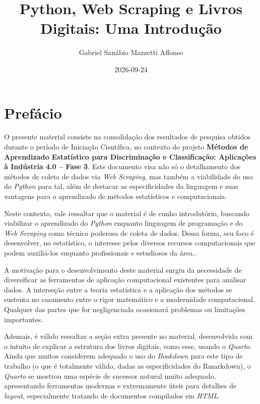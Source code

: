 \documentclass[
  brazilian,
  letterpaper,
  DIV=11,
  numbers=noendperiod]{scrreprt}
\title{Python, Web Scraping e Livros Digitais: Uma Introdução}
\author{Gabriel Sanábio Mazzetti Affonso}
\date{2026-09-24}
\renewcommand*\contentsname{Índice}
\newcommand\contentsname{Índice}
\begin{document}
\maketitle

\renewcommand*\contentsname{Índice}
{
\hypersetup{linkcolor=}
\setcounter{tocdepth}{2}
\tableofcontents
}


\chapter*{Prefácio}\label{prefuxe1cio}


O presente material consiste na consolidação dos resultados de pesquisa
obtidos durante o período de Iniciação Científica, no contexto do
projeto \textbf{Métodos de Aprendizado Estatístico para Discriminação e
Classificação: Aplicações à Indústria 4.0 -- Fase 3}. Este documento
visa não só o detalhamento dos métodos de coleta de dados via \emph{Web
Scraping}, mas também a viabilidade do uso do \emph{Python} para tal,
além de destacar as especificidades da linguagem e suas vantagens para o
aprendizado de métodos estatísticos e computacionais.

Neste contexto, vale ressaltar que o material é de cunho introdutório,
buscando viabilizar o aprendizado do \emph{Python} enquanto linguagem de
programação e do \emph{Web Scraping} como técnica poderosa de coleta de
dados. Dessa forma, seu foco é desenvolver, no estatístico, o interesse
pelos diversos recursos computacionais que podem auxiliá-los enquanto
profissionais e estudiosos da área..

A motivação para o desenvolvimento deste material surgiu da necessidade
de diversificar as ferramentas de aplicação computacional existentes
para analisar dados. A interseção entre a teoria estatística e a
aplicação dos métodos se sustenta no casamento entre o rigor matemático
e a modernidade computacional. Qualquer das partes que for negligenciada
ocasionará problemas ou limitações importantes.

Ademais, é válido ressaltar a seção extra presente no material,
desenvolvida com o intuito de explicar a estrutura dos livros digitais,
como esse, usando o \emph{Quarto}. Ainda que muitos considerem adequado
o uso do \emph{Bookdown} para este tipo de trabalho (o que é totalmente
válido, dadas as especificidades do Rmarkdown), o \emph{Quarto} se
mostrou uma espécie de sucessor natural muito adequado, apresentando
ferramentas modernas e extremamente úteis para detalhes de
\emph{layout}, especialmente tratando de documentos compilados em
\emph{HTML}.
\end{document}
